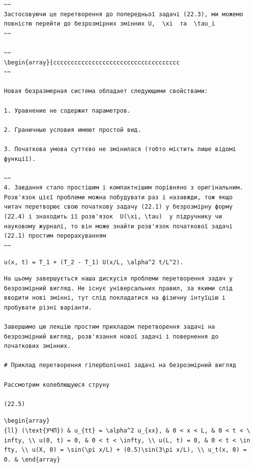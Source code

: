 \documentclass[
  ukrainian,
]{article}
\begin{document}
\begin{verbatim}
~~
Застосовуючи це перетворення до попередньої задачі (22.3), ми можемо повністю перейти до безрозмірних змінних U,  \xi  та  \tau_i
~~

~~
\begin{array}{cccccccccccccccccccccccccccccccccccc
~~

Новая безразмерная система обладает следующими свойствами:

1. Уравнение не содержит параметров.

2. Граничные условия имеют простой вид.

3. Початкова умова суттєво не змінилася (тобто містить лише відомі функції).

~~
4. Завдання стало простішим і компактнішим порівняно з оригінальним. Розв'язок цієї проблеми можна побудувати раз і назавжди, тож якщо читач перетворює свою початкову задачу (22.1) у безрозмірну форму (22.4) і знаходить її розв'язок  U(\xi, \tau)  у підручнику чи науковому журналі, то він може знайти розв'язок початкової задачі (22.1) простим перерахуванням
~~
\end{verbatim}

\texttt{u(x,\ t)\ =\ T\_1\ +\ (T\_2\ -\ T\_1)\ U(x/L,\ \textbackslash{}alpha\^{}2\ t/L\^{}2).}

\begin{verbatim}
На цьому завершується наша дискусія проблеми перетворення задач у безрозмірний вигляд. Не існує універсальних правил, за якими слід вводити нові змінні, тут слід покладатися на фізичну інтуїцію і пробувати різні варіанти.

Завершимо цю лекцію простим прикладом перетворення задачі на безрозмірний вигляд, розв'язання нової задачі і повернення до початкових змінних.

# Приклад перетворення гіперболічної задачі на безрозмірний вигляд

Рассмотрим колеблющуюся струну

(22.5)
\end{verbatim}

\texttt{\textbackslash{}begin\{array\}\{ll\}\ (\textbackslash{}text\{УЧП\})\ \&\ u\_\{tt\}\ =\ \textbackslash{}alpha\^{}2\ u\_\{xx\},\ \&\ 0\ \textless{}\ x\ \textless{}\ L,\ \&\ 0\ \textless{}\ t\ \textless{}\ \textbackslash{}infty,\ \textbackslash{}\textbackslash{}\ u(0,\ t)\ =\ 0,\ \&\ 0\ \textless{}\ t\ \textless{}\ \textbackslash{}infty,\ \textbackslash{}\textbackslash{}\ u(L,\ t)\ =\ 0,\ \&\ 0\ \textless{}\ t\ \textless{}\ \textbackslash{}infty,\ \textbackslash{}\textbackslash{}\ u(X,\ 0)\ =\ \textbackslash{}sin(\textbackslash{}pi\ x/L)\ +\ (0.5)\textbackslash{}sin(3\textbackslash{}pi\ x/L),\ \textbackslash{}\textbackslash{}\ u\_t(x,\ 0)\ =\ 0.\ \&\ \textbackslash{}end\{array\}}
\end{document}

